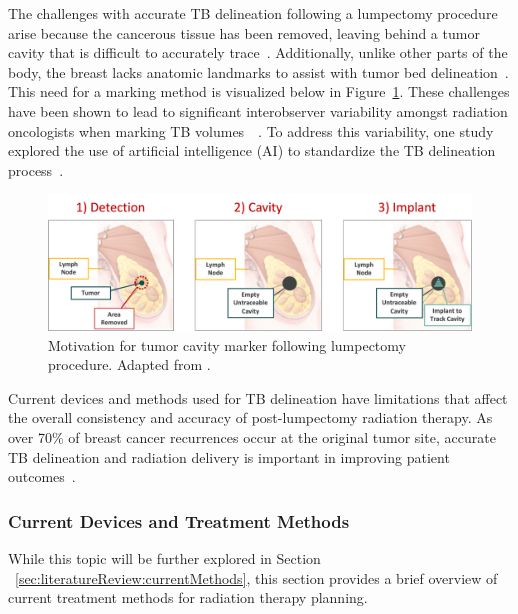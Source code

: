 The challenges with accurate TB delineation following a lumpectomy procedure arise because the cancerous tissue has been removed, leaving behind a tumor cavity that is difficult to accurately trace~\cite{RefWorks:RefID:25-acree2022review}. Additionally, unlike other parts of the body, the breast lacks anatomic landmarks to assist with tumor bed delineation~\cite{RefWorks:RefID:344-mitchell2019adaptable}. This need for a marking method is visualized below in Figure~\ref{fig:introduction:need_for_tumor_bed_marker}. These challenges have been shown to lead to significant interobserver variability amongst radiation oncologists when marking TB volumes~\cite{RefWorks:RefID:191-kader2008ctbased}~\cite{RefWorks:RefID:194-kirby2013tumour}. To address this variability, one study explored the use of artificial intelligence (AI) to standardize the TB delineation process~\cite{RefWorks:RefID:195-poortmans2019winter}.

\begin{figure}[h!]
        \centering
        \includegraphics[width=\linewidth]{../figs/introduction/need_for_tumor_bed_marker.png}
        \caption{Motivation for tumor cavity marker following lumpectomy procedure. Adapted from \cite{RefWorks:RefID:38-johnbreastconserving}.}
        \label{fig:introduction:need_for_tumor_bed_marker}
\end{figure}

Current devices and methods used for TB delineation have limitations that affect the overall consistency and accuracy of post-lumpectomy radiation therapy. As over 70\% of breast cancer recurrences occur at the original tumor site, accurate TB delineation and radiation delivery is important in improving patient outcomes~\cite{RefWorks:RefID:25-acree2022review}.

\subsubsection{Current Devices and Treatment Methods\label{sec:introduction:motivation:currentDevicesAndMethods}}
While this topic will be further explored in Section ~\ref{sec:literatureReview:currentMethods}, this section provides a brief overview of current treatment methods for radiation therapy planning.

